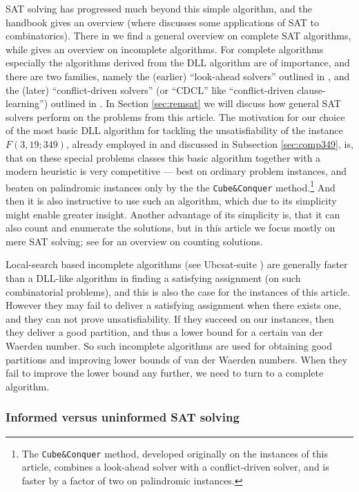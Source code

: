 \documentclass[final,3p,times]{elsarticle}
\theoremstyle{definition}
\newcommand{\cubeconq}{\texttt{Cube\:\&\:Conquer}}
\begin{document}
SAT solving has progressed much beyond this simple algorithm, and the handbook \cite{2008HandbuchSAT} gives an overview (where \cite{Zha09HBSAT} discusses some applications of SAT to combinatorics). There in \cite{DP09HBSAT} we find a general overview on complete SAT algorithms, while \cite{KSS09HBSAT} gives an overview on incomplete algorithms. For complete algorithms especially the algorithms derived from the DLL algorithm are of importance, and there are two families, namely the (earlier) ``look-ahead solvers'' outlined in \cite{HvM09HBSAT}, and the (later) ``conflict-driven solvers'' (or ``CDCL'' like ``conflict-driven clause-learning'') outlined in \cite{MSLM09HBSAT}. In Section \ref{sec:remsat} we will discuss how general SAT solvers perform on the problems from this article. The motivation for our choice of the most basic DLL algorithm for tackling the unsatisfiability of the instance $F(3,19; 349)$, already employed in \cite{ahmed2010} and discussed in Subsection \ref{sec:comp349}, is, that on these special problems classes this basic algorithm together with a modern heuristic is very competitive --- best on ordinary problem instances, and beaten on palindromic instances only by the the \cubeconq{} method.\footnote{The \cubeconq{} method, developed originally on the instances of this article, combines a look-ahead solver with a conflict-driven solver, and is faster by a factor of two on palindromic instances.} And then it is also instructive to use such an algorithm, which due to its simplicity might enable greater insight. Another advantage of its simplicity is, that it can also count and enumerate the solutions, but in this article we focus mostly on mere SAT solving; see \cite{GSS09HBSAT} for an overview on counting solutions.

Local-search based incomplete algorithms (see Ubcsat-suite \cite{ubcsat})
are generally faster than a DLL-like algorithm in finding a satisfying assignment (on such combinatorial problems), and this is also the case for the instances of this article. However they may fail to deliver a satisfying assignment when there exists one, and they can not prove unsatisfiability. If they succeed on our instances, then they deliver a good partition, and thus a lower bound for a certain van der Waerden number. So such incomplete algorithms are used for obtaining good partitions and improving lower bounds of van der Waerden numbers. When they fail to improve the lower bound any further, we need to turn to a complete algorithm.


\subsubsection{Informed versus uninformed SAT solving}
\label{sec:infvsuninf}
\end{document}
